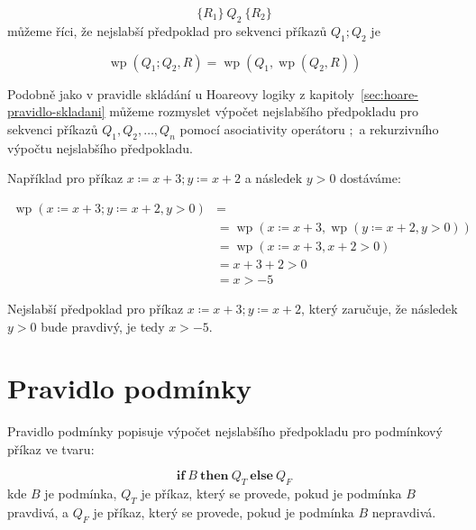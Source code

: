\begin{equation*}
    \{ R_1 \} \  Q_2 \  \{ R_2 \}
\end{equation*}
můžeme říci, že nejslabší předpoklad pro sekvenci příkazů $Q_1; Q_2$ je

\begin{equation*}
    \operatorname{wp}(Q_1; Q_2, R) = \operatorname{wp}(Q_1, \operatorname{wp}(Q_2, R))
\end{equation*}

Podobně jako v pravidle skládání u Hoareovy logiky z kapitoly~\ref{sec:hoare-pravidlo-skladani}
můžeme rozmyslet výpočet nejslabšího předpokladu pro sekvenci příkazů $Q_1, Q_2, \ldots, Q_n$
pomocí asociativity operátoru $;$ a rekurzivního výpočtu nejslabšího předpokladu.

Například pro příkaz $x \coloneqq x + 3; y \coloneqq x + 2$ a následek $y > 0$ dostáváme:

\begin{align*}
    \operatorname{wp}(x \coloneqq x + 3; y \coloneqq x + 2, y > 0) & = \\
                                                     & = \operatorname{wp}(x \coloneqq x + 3, \operatorname{wp}(y \coloneqq x + 2, y > 0)) \\
                                                     & = \operatorname{wp}(x \coloneqq x + 3, x + 2 > 0) \\
                                                     & = x + 3 + 2 > 0 \\
                                                     & = x > -5
\end{align*}

Nejslabší předpoklad pro příkaz $x \coloneqq x + 3; y \coloneqq x + 2$, který zaručuje, že
následek $y > 0$ bude pravdivý, je tedy $x > -5$.

\section{Pravidlo podmínky}
\label{sec:pravidlo-podminky}

Pravidlo podmínky popisuje výpočet nejslabšího předpokladu pro podmínkový příkaz ve tvaru:

\begin{equation*}
    \textbf{if} \ B \ \textbf{then} \ Q_T \ \textbf{else} \ Q_F
\end{equation*}
kde $B$ je podmínka, $Q_T$ je příkaz, který se provede, pokud je podmínka $B$ pravdivá,
a $Q_F$ je příkaz, který se provede, pokud je podmínka $B$ nepravdivá.

